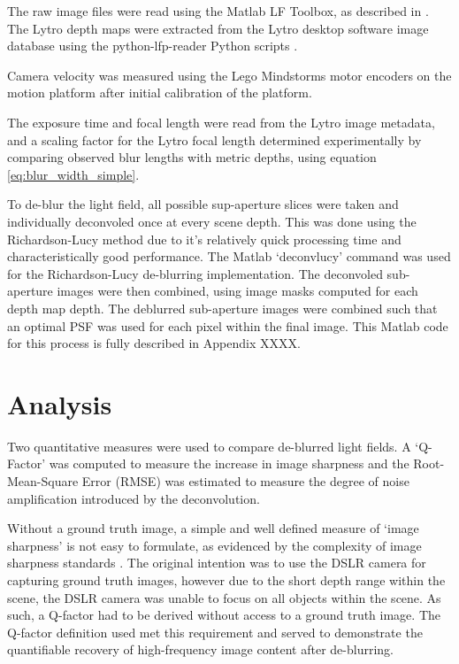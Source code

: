 The raw image files were read using the Matlab LF Toolbox, as described in \cite{dansereau2013toolbox}.
The Lytro depth maps were extracted from the Lytro desktop software image database using the python-lfp-reader Python scripts \cite{esfahbod2013python}.

Camera velocity was measured using the Lego Mindstorms motor encoders on the motion platform after initial calibration of the platform.

The exposure time and focal length were read from the Lytro image metadata, and a scaling factor for the Lytro focal length determined experimentally by comparing observed blur lengths with metric depths, using equation \ref{eq:blur_width_simple}.

To de-blur the light field, all possible sup-aperture slices were taken and individually deconvoled once at every scene depth.
This was done using the Richardson-Lucy method due to it's relatively quick processing time and characteristically good performance.
The Matlab \enquote*{deconvlucy} command was used for the Richardson-Lucy de-blurring implementation.
The deconvoled sub-aperture images were then combined, using image masks computed for each depth map depth.
The deblurred sub-aperture images were combined such that an optimal PSF was used for each pixel within the final image.
This Matlab code for this process is fully described in Appendix XXXX.


\section{Analysis}
\label{sec:analysis}

Two quantitative measures were used to compare de-blurred light fields.
A \enquote*{Q-Factor} was computed to measure the increase in image sharpness and the Root-Mean-Square Error (RMSE) was estimated to measure the degree of noise amplification introduced by the deconvolution.

Without a ground truth image, a simple and well defined measure of \enquote*{image sharpness} is not easy to formulate, as evidenced by the complexity of image sharpness standards \cite{imatest2014sharpness}.
The original intention was to use the DSLR camera for capturing ground truth images, however due to the short depth range within the scene, the DSLR camera was unable to focus on all objects within the scene.
As such, a Q-factor had to be derived without access to a ground truth image.
The Q-factor definition used met this requirement and served to demonstrate the quantifiable recovery of high-frequency image content after de-blurring.

